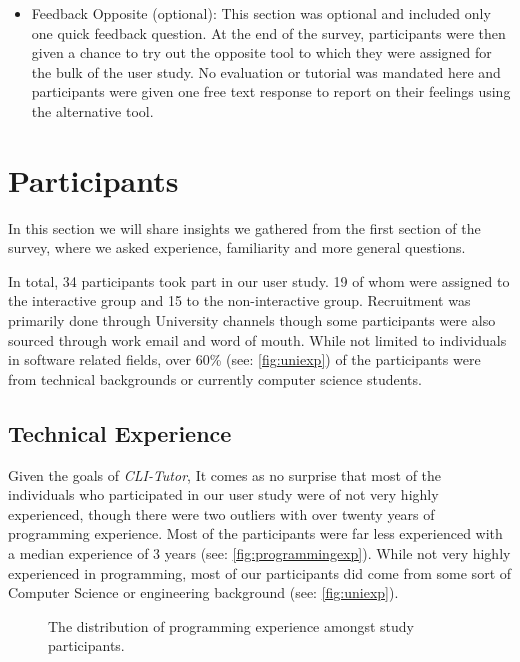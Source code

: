 \begin{itemize}
	\item Feedback Opposite (optional): This section was optional and included
	      only one quick feedback question. At the end of the survey,
	      participants were then given a chance to try out the opposite tool to
	      which they were assigned for the bulk of the user study. No evaluation
	      or tutorial was mandated here and participants were given one free text
	      response to report on their feelings using the alternative tool.
\end{itemize}


\section{Participants}

In this section we will share insights we gathered from the first section of
the survey, where we asked experience, familiarity and more general questions.

In total, 34 participants took part in our user study. 19 of whom were assigned
to the interactive group and 15 to the non-interactive group. Recruitment was
primarily done through University channels though some participants were also
sourced through work email and word of mouth. While not limited to individuals
in software related fields, over 60\% (see: \autoref{fig:uniexp}) of the
participants were from technical backgrounds or currently computer science
students.

\subsection{Technical Experience}

Given the goals of \textit{CLI-Tutor}, It comes as no surprise that most of the
individuals who participated in our user study were of not very highly
experienced, though there were two outliers with over twenty years of
programming experience. Most of the participants were far less experienced with
a median experience of 3 years (see: \autoref{fig:programmingexp}). While not
very highly experienced in programming, most of our participants did come from
some sort of Computer Science or engineering background (see:
\autoref{fig:uniexp}).

\begin{figure}[H]
	\centering
	\scalebox{0.75}{}
	\caption{The distribution of programming experience amongst study participants.}
	\label{fig:programmingexp}
\end{figure}

